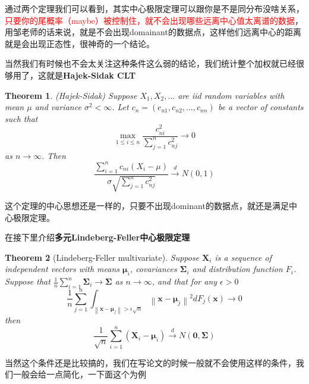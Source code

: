 \documentclass{article}
\newtheorem{theorem}{Theorem}[section]
\begin{document}
通过两个定理我们可以看到，其实中心极限定理可以跟你是不是同分布没啥关系，\textcolor{red}{只要你的尾概率（maybe）被控制住，就不会出现哪些远离中心值太离谱的数据}，用邹老师的话来说，就是不会出现domainant的数据点，这样他们远离中心的距离就是会出现正态性，很神奇的一个结论。
\par 当然我们有时候也不会太关注这种条件这么弱的结论，我们统计整个加权就已经很够用了，这就是\textbf{Hajek-Sidak CLT}
\begin{theorem}
	(Hajek-Sidak) Suppose $X_1, X_2, \ldots$ are iid random variables with mean $\mu$ and variance $\sigma^2<\infty$. Let $c_n=\left(c_{n 1}, c_{n 2}, \ldots, c_{n n}\right)$ be a vector of constants such that
	$$
	\max _{1 \leq i \leq n} \frac{c_{n i}^2}{\sum_{j=1}^n c_{n j}^2} \rightarrow 0
	$$
	as $n \rightarrow \infty$. Then
	$$
	\frac{\sum_{i=1}^n c_{n i}\left(X_i-\mu\right)}{\sigma \sqrt{\sum_{j=1}^n c_{n j}^2}} \stackrel{d}{\rightarrow} N(0,1)
	$$
\end{theorem}
这个定理的中心思想还是一样的，只要不出现dominant的数据点，就还是满足中心极限定理。
\par 在接下里介绍\textbf{多元Lindeberg-Feller中心极限定理}
\begin{theorem}[Lindeberg-Feller multivariate]
	Suppose $\mathbf{X}_i$ is a sequence of independent vectors with means $\boldsymbol{\mu}_i$, covariances $\boldsymbol{\Sigma}_i$ and distribution function $F_i$. Suppose that $\frac{1}{n} \sum_{i=1}^n \boldsymbol{\Sigma}_i \rightarrow \boldsymbol{\Sigma}$ as $n \rightarrow \infty$, and that for any $\epsilon>0$
	$$
	\frac{1}{n} \sum_{j=1}^n \int_{\left\|\mathbf{x}-\boldsymbol{\mu}_j\right\|>\epsilon \sqrt{n}}\left\|\mathbf{x}-\boldsymbol{\mu}_j\right\|^2 d F_j(\mathbf{x}) \rightarrow 0
	$$
	then
	$$
	\frac{1}{\sqrt{n}} \sum_{i=1}^n\left(\mathbf{X}_i-\boldsymbol{\mu}_i\right) \stackrel{d}{\rightarrow} N(\mathbf{0}, \boldsymbol{\Sigma})
	$$
\end{theorem}
当然这个条件还是比较搞的，我们在写论文的时候一般就不会使用这样的条件，我们一般会给一点简化，一下面这个为例
\end{document}
